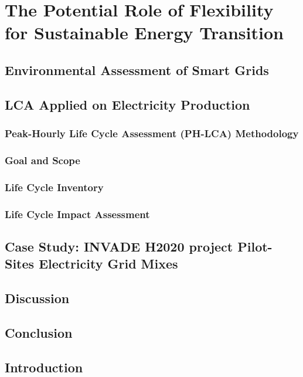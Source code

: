 \chapter{The Potential Role of Flexibility for Sustainable Energy Transition}
\label{chapterLCA}
\section{Environmental Assessment of Smart Grids}
\section{LCA Applied on Electricity Production}
\subsection{Peak-Hourly Life Cycle Assessment (PH-LCA) Methodology}
\subsection{Goal and Scope}
\subsection{Life Cycle Inventory}
\subsection{Life Cycle Impact Assessment}
\section{Case Study: INVADE H2020 project Pilot-Sites Electricity Grid Mixes}
\section{Discussion}
\section{Conclusion}

\section{Introduction} \label{Introduction}

